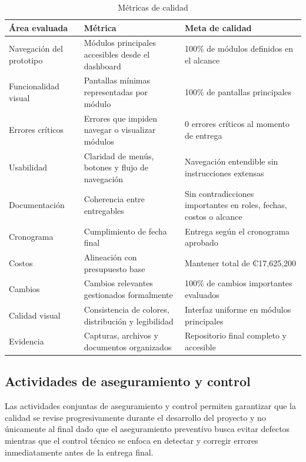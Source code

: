 \documentclass[11pt,spanish]{article}
\begin{document}
\begin{table}[H]
\centering
\caption{Métricas de calidad}
\label{tab:metricas-calidad}
{\small
\setlength{\tabcolsep}{3.5pt}
\begin{tabularx}{\textwidth}{p{3.8cm} Y Y}
\toprule
\textbf{Área evaluada} & \textbf{Métrica} & \textbf{Meta de calidad} \\
\midrule
Navegación del prototipo & Módulos principales accesibles desde el dashboard & 100\% de módulos definidos en el alcance \\
Funcionalidad visual & Pantallas mínimas representadas por módulo & 100\% de pantallas principales \\
Errores críticos & Errores que impiden navegar o visualizar módulos & 0 errores críticos al momento de entrega \\
Usabilidad & Claridad de menús, botones y flujo de navegación & Navegación entendible sin instrucciones extensas \\
Documentación & Coherencia entre entregables & Sin contradicciones importantes en roles, fechas, costos o alcance \\
Cronograma & Cumplimiento de fecha final & Entrega según el cronograma aprobado \\
Costos & Alineación con presupuesto base & Mantener total de ₡17,625,200 \\
Cambios & Cambios relevantes gestionados formalmente & 100\% de cambios importantes evaluados \\
Calidad visual & Consistencia de colores, distribución y legibilidad & Interfaz uniforme en módulos principales \\
Evidencia & Capturas, archivos y documentos organizados & Repositorio final completo y accesible \\
\bottomrule
\end{tabularx}
}
\end{table}

\subsection{Actividades de aseguramiento y control}

Las actividades conjuntas de aseguramiento y control permiten garantizar que la calidad se revise progresivamente durante el desarrollo del proyecto y no únicamente al final dado que el aseguramiento preventivo busca evitar defectos mientras que el control técnico se enfoca en detectar y corregir errores inmediatamente antes de la entrega final.
\end{document}
